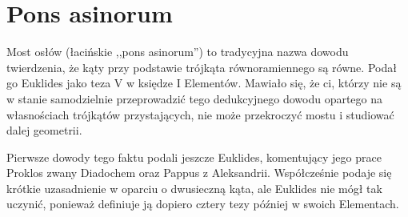
\section{Pons asinorum}
%
%
Most osłów (łacińskie ,,pons asinorum'') to tradycyjna nazwa dowodu twierdzenia, że kąty przy podstawie trójkąta równoramiennego są równe.
Podał go Euklides jako teza V w księdze I Elementów.
Mawiało się, że ci, którzy nie są w stanie samodzielnie przeprowadzić tego dedukcyjnego dowodu opartego na własnościach trójkątów przystających, nie może przekroczyć mostu i studiować dalej geometrii.

Pierwsze dowody tego faktu podali jeszcze Euklides, komentujący jego prace Proklos zwany Diadochem oraz Pappus z Aleksandrii.
%
%
%
Współcześnie podaje się krótkie uzasadnienie w oparciu o dwusieczną kąta, ale Euklides nie mógł tak uczynić, ponieważ definiuje ją dopiero cztery tezy później w swoich Elementach.

